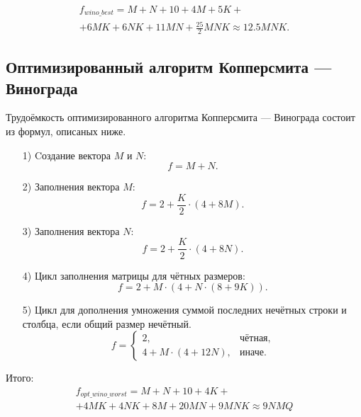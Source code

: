 \documentclass[a4paper,14pt, unknownkeysallowed]{extreport}
\begin{document}
\begin{equation}
    \begin{gathered}
	f_{wino\_best} = M + N + 10 + 4M + 5K + \\ + 6MK + 6NK + 11MN + \frac{25}{2}MNK \approx 12.5MNK.
    \end{gathered}
\end{equation}

\subsection{Оптимизированный алгоритм Копперсмита — Винограда}

Трудоёмкость оптимизированного алгоритма Копперсмита — Винограда состоит из формул, описаных ниже.
\begin{enumerate}
	\item[1)] Cоздание вектора $M$ и $N$:
	\begin{equation}
		f = M + N.
	\end{equation}
		
	\item[2)] Заполнения вектора $M$:
	\begin{equation}
		f = 2 + \frac{K}{2} \cdot (4 + 8M).
	\end{equation}
		
	\item[3)] Заполнения вектора $N$:
	\begin{equation}
		f = 2 + \frac{K}{2} \cdot (4 + 8N).
	\end{equation}
		
	\item[4)] Цикл заполнения матрицы для чётных размеров:
	\begin{equation}
		f = 2 + M \cdot (4 + N \cdot (8 + 9K)).
	\end{equation}
		
	\item[5)] Цикл для дополнения умножения суммой последних нечётных строки и столбца, если общий размер нечётный.
	\begin{equation}
	f = \begin{cases}
		2, & \text{чётная,}\\
		4 + M \cdot (4 + 12N), & \text{иначе.}
		\end{cases}
	\end{equation}
\end{enumerate}

Итого:
\begin{equation}
    \begin{gathered}
	   f_{opt\_wino\_worst} = M + N + 10 + 4K + \\ + 4MK + 4NK + 8M + 20MN + 9MNK \approx 9NMQ
    \end{gathered}
\end{equation}
\end{document}
